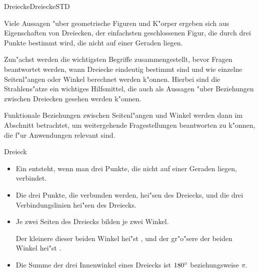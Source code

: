 \begin{MXContent}{Dreiecke}{Dreiecke}{STD}

Viele Aussagen "uber geometrische Figuren und K"orper ergeben sich aus 
Eigenschaften von Dreiecken, der {\glqq}einfachsten geschlossenen Figur{\grqq}, 
die durch drei Punkte bestimmt wird, die nicht auf einer Geraden liegen. 


Zun"achst werden die wichtigsten Begriffe zusammengestellt, bevor Fragen 
beantwortet werden, wann Dreiecke eindeutig bestimmt sind und wie einzelne 
Seitenl"angen oder Winkel berechnet werden k"onnen. 
Hierbei sind die Strahlens"atze ein wichtiges Hilfsmittel, die auch als 
Aussagen "uber Beziehungen zwischen Dreiecken gesehen werden k"onnen.

Funktionale Beziehungen 
zwischen Seitenl"angen und Winkel werden dann im Abschnitt
 betrachtet, um weitergehende Fragestellungen 
beantworten zu k"onnen, die f"ur Anwendungen relevant sind.

\begin{MXInfo}{Dreieck}%
\begin{itemize}
 \item Ein  entsteht,
       wenn man drei Punkte, die nicht auf einer Geraden liegen, verbindet.
       
 \item Die drei Punkte, die verbunden werden, hei"sen
        des Dreiecks, und
       die drei Verbindungslinien hei"sen
        des Dreiecks.
       
 \item Je zwei Seiten des Dreiecks bilden je zwei Winkel.
   
       Der kleinere dieser beiden Winkel hei"st
       ,
       und der gr"o"sere der beiden Winkel hei"st
       .
 
 \item Die Summe der drei Innenwinkel eines Dreiecks ist
 $180{}^{\circ}$ beziehungsweise $\pi$.
\end{itemize}
\end{MXInfo}


\end{MXContent}
